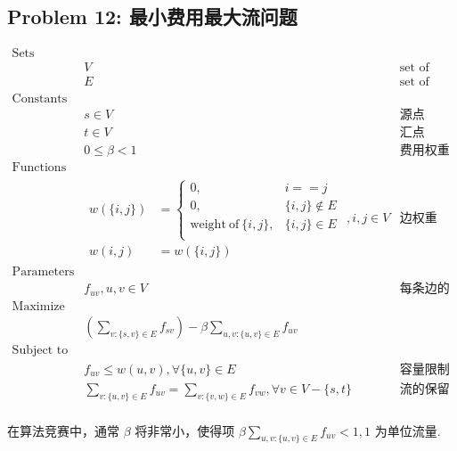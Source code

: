 \documentclass[11pt]{article}
\begin{document}
\newpage
\subsection*{Problem 12: 最小费用最大流问题}

\begin{eqnarray*}
    \textrm{Sets} \\
        & V & \textrm{set of vertices} \\
        & E & \textrm{set of edges} \\
    \textrm{Constants} \\
        & s \in V & \textrm{源点} \\
        & t \in V & \textrm{汇点} \\
        & 0 \leq \beta < 1 & \textrm{费用权重参数} \\
    \textrm{Functions} \\
        & \begin{array}{rl}
            w(\{i, j\}) &= \left\{
                \begin{array}{ll}
                    0, & i == j \\
                    0, & \{i, j\} \notin E \\
                    \mathrm{weight\ of\ }\{i, j\}, & \{i, j\} \in E \\
                \end{array}
            \right. \\
            w(i, j) &= w(\{i, j\})
        \end{array}, i, j \in V & \textrm{边权重} \\
    \textrm{Parameters} \\
        & f_{uv}, u, v \in V & \textrm{每条边的流量} \\
    \textrm{Maximize} \\
        & \displaystyle (\sum_{v: \{s, v\} \in E} f_{sv}) - \beta \sum_{u, v: \{u, v\} \in E} f_{uv} & \textrm{} \\
    \textrm{Subject to} \\
        & f_{uv} \leq w(u, v), \forall \{u, v\} \in E & \textrm{容量限制} \\
        & \displaystyle \sum_{v: \{u, v\} \in E} f_{uv} = \sum_{v: \{v, w\} \in E} f_{vw}, \forall v \in V - \{s, t\} & \textrm{流的保留} \\ 
\end{eqnarray*}

在算法竞赛中，通常 $\beta$ 将非常小，使得项 $\displaystyle \beta \sum_{u, v: \{u, v\} \in E} f_{uv} < 1, 1$ 为单位流量.
\end{document}
